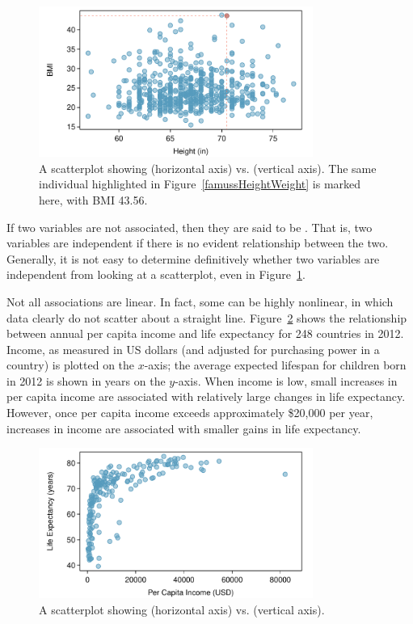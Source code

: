 \begin{figure}[h!]
\centering
\includegraphics[width=0.8\textwidth]
{ch_intro_to_data_oi_biostat/figures/famussHeightBmi/famussHeightBmi.pdf}
\caption{A scatterplot showing  (horizontal axis) vs.   (vertical axis). The same individual highlighted in Figure~\ref{famussHeightWeight} is marked here, with BMI 43.56.} 
\label{famussHeightBmi}
\end{figure}


If two variables are not associated, then they are said to be . That is, two variables are independent if there is no evident relationship between the two.  Generally, it is not easy to determine definitively whether two variables are independent from looking at a scatterplot, even in Figure~\ref{famussHeightBmi}.



Not all associations are linear. In fact, some can be highly nonlinear, in which data clearly do not scatter about a straight line. Figure~\ref{incomeLifeExpectancy} shows the relationship between annual per capita income and life expectancy for 248 countries in 2012. Income, as measured in US dollars (and adjusted for purchasing power in a country) is plotted on the $x$-axis; the average expected lifespan for children born in 2012 is shown in years on the $y$-axis. When income is low, small increases in per capita income are associated with relatively large changes in life expectancy. However, once per capita income exceeds approximately \$20,000 per year, increases in income are associated with smaller gains in life expectancy.

\begin{figure}[h]
\centering
\includegraphics[width=0.8\textwidth]
{ch_intro_to_data_oi_biostat/figures/incomeLifeExpectancy/incomeLifeExpectancy.pdf}
\caption{A scatterplot showing  (horizontal axis) vs.   (vertical axis).} 
\label{incomeLifeExpectancy}
\end{figure}


